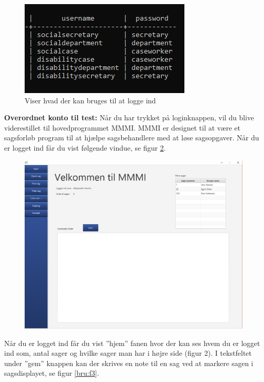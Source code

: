 \begin{figure}[h]
  \includegraphics[scale=1]{./PNG/brugervejledning/loginInfo.PNG} 
  \caption{Viser hvad der kan bruges til at logge ind}  
  \label{bru:login}
\end{figure}
\newpage
\textbf{Overordnet konto til test:}
Når du har trykket på loginknappen, vil du blive viderestillet til hovedprogrammet MMMI. MMMI er designet til at være et sagsforløb program til at hjælpe sagsbehandlere med at løse sagsopgaver. 
Når du er logget ind får du vist følgende vindue, se figur \ref{bru:f2}. 
\begin{figure}[htb!]
  \includegraphics[width = \linewidth]{./PNG/brugervejledning/figur2.PNG} 
  \caption{}  
  \label{bru:f2}
\end{figure}
\newpage
Når du er logget ind får du vist ”hjem” fanen hvor der kan ses hvem du er logget ind som, antal sager og hvilke sager man har i højre side (figur 2). I tekstfeltet under ”gem” knappen kan der skrives en note til en sag ved at markere sagen i sagsdisplayet, se figur \ref{bru:f3}. 
